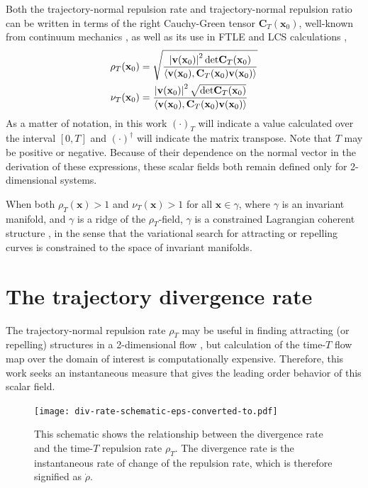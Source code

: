 \documentclass[twocolumn]{svjour3}
\begin{document}
Both the trajectory-normal repulsion rate and trajectory-normal repulsion ratio can be written in terms of the right Cauchy-Green tensor $\mathbf{C}_T (\mathbf{x}_0)$, well-known from continuum mechanics \cite{truesdell2004non}, as well as its use in FTLE and LCS calculations \cite{haller_variational_2011},
\begin{equation}
\begin{aligned}
\rho_T(\mathbf{x}_0) 
& = \sqrt{ \frac{
\left| \mathbf{v}(\mathbf{x}_0)\right|^2 {\rm det} \mathbf{C}_T (\mathbf{x}_0)}{
\langle \mathbf{v}(\mathbf{x}_0),\mathbf{C}_T (\mathbf{x}_0) \mathbf{v}(\mathbf{x}_0) \rangle
} } \\
\nu_T(\mathbf{x}_0) 
& =  \frac{
\left| \mathbf{v}(\mathbf{x}_0)\right|^2 \sqrt{{\rm det} \mathbf{C}_T (\mathbf{x}_0)}}{
\langle \mathbf{v}(\mathbf{x}_0),\mathbf{C}_T (\mathbf{x}_0) \mathbf{v}(\mathbf{x}_0) \rangle
}
\end{aligned}
\label{eq:rhoT}
\end{equation}
As a matter of notation, in this work \((\cdot)_T\) will indicate a value calculated over the interval $[0, T]$ and \((\cdot)^\dagger\) will indicate the matrix transpose. Note that $T$ may be positive or negative. Because of their dependence on the normal vector in the derivation of these expressions, these scalar fields both remain defined only for 2-dimensional systems.

When both $\rho_T(\mathbf{x})>1$ and $\nu_T(\mathbf{x})>1$ for all $\mathbf{x}\in\gamma$, where $\gamma$ is an invariant manifold, and $\gamma$ is a ridge of the $\rho_T$-field, $\gamma$ is a constrained Lagrangian coherent structure \cite{haller_variational_2011}, in the sense that the variational search for attracting or repelling curves is constrained to the space of invariant manifolds.

\section{The trajectory divergence rate}\label{s:Derivation}
The trajectory-normal repulsion rate \(\rho_T\) may be useful in finding attracting (or repelling) structures in a 2-dimensional flow \cite{haller_variational_2011}, but calculation of the time-$T$ flow map over the domain of interest is computationally expensive. Therefore, this work seeks an instantaneous measure that gives the leading order behavior of this scalar field.

\begin{figure}
\centering
\texttt{[image: div-rate-schematic-eps-converted-to.pdf]}
\caption{This schematic shows the relationship between the divergence rate and the time-$T$ repulsion rate $\rho_T$. The divergence rate is the instantaneous rate of change of the repulsion rate, which is therefore signified as $\dot{\rho}$.}
\label{fig:div-rate-schematic}
\end{figure}
\end{document}
